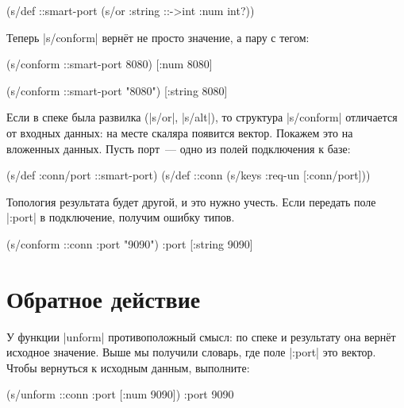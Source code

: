 \begin{english}
  \begin{clojure}
(s/def ::smart-port
  (s/or :string ::->int :num int?))
  \end{clojure}
\end{english}

\noindent
Теперь \spverb|s/conform| верн\"{е}т не просто значение, а пару с тегом:

\begin{english}
  \begin{clojure}
(s/conform ::smart-port 8080)
[:num 8080]

(s/conform ::smart-port "8080")
[:string 8080]
  \end{clojure}
\end{english}


Если в спеке была развилка (\spverb|s/or|, \spverb|s/alt|), то структура
\spverb|s/conform| отличается от входных данных: на месте скаляра появится
вектор. Покажем это на вложенных данных. Пусть порт~--- одно из полей
подключения к базе:

\begin{english}
  \begin{clojure}
(s/def :conn/port ::smart-port)
(s/def ::conn
  (s/keys :req-un [:conn/port]))
  \end{clojure}
\end{english}

Топология результата будет другой, и это нужно учесть. Если передать поле
\spverb|:port| в подключение, получим ошибку типов.

\begin{english}
  \begin{clojure}
(s/conform ::conn {:port "9090"})
{:port [:string 9090]}
  \end{clojure}
\end{english}

\section{Обратное действие}


У функции \spverb|unform| противоположный смысл: по спеке и результату она
верн\"{е}т исходное значение. Выше мы получили словарь, где поле \spverb|:port| это
вектор. Чтобы вернуться к исходным данным, выполните:

\begin{english}
  \begin{clojure}
(s/unform ::conn {:port [:num 9090]})
{:port 9090}
  \end{clojure}
\end{english}

